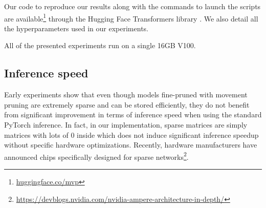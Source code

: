 \documentclass{article}
\begin{document}
Our code to reproduce our results along with the commands to launch the scripts are available\footnote{\url{huggingface.co/mvp}} through the Hugging Face Transformers library \citep{Wolf2019HuggingFacesTS}. We also detail all the hyperparameters used in our experiments.

All of the presented experiments run on a single 16GB V100.


\subsection{Inference speed}

Early experiments show that even though models fine-pruned with movement pruning are extremely sparse and can be stored efficiently, they do not benefit from significant improvement in terms of inference speed when using the standard PyTorch inference. In fact, in our implementation, sparse matrices are simply matrices with lots of 0 inside which does not induce significant inference speedup without specific hardware optimizations. Recently, hardware manufacturers have announced chips specifically designed for sparse networks\footnote{\url{https://devblogs.nvidia.com/nvidia-ampere-architecture-in-depth/}}.
\end{document}
